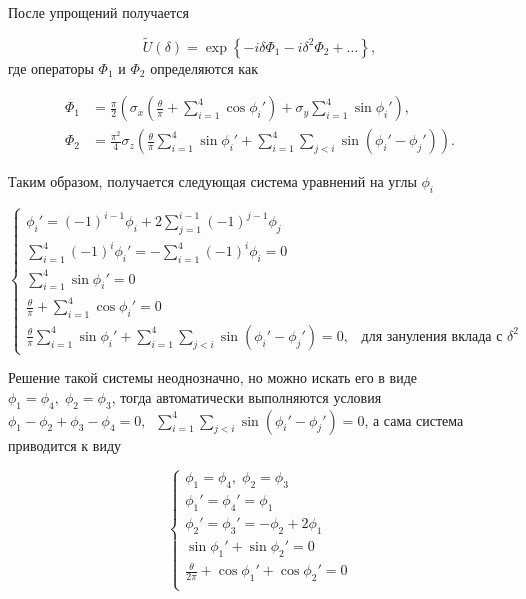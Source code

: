 После упрощений получается

\begin{equation}
	\tilde{U}(\delta) = \exp{\left\{ -i\delta \Phi_1 - i\delta^2 \Phi_2+\ldots \right\}},
\end{equation}
где операторы $\Phi_1$ и $\Phi_2$ определяются как

\begin{equation}
	\begin{aligned}
		\Phi_1 & = \frac{\pi}{2}\left(\sigma_x \left(\frac{\theta}{\pi} + \sum_{i=1}^{4}\cos \phi_i' \right)+\sigma_y \sum_{i=1}^{4}\sin \phi_i'\right), \\
		\Phi_2 & = \frac{\pi^2}{4}\sigma_z\left(\frac{\theta}{\pi}\sum_{i=1}^{4}\sin \phi_i' + 
	\sum_{i=1}^{4} \sum_{j<i} \sin\left(\phi_i' - \phi_j'\right) \right).
	\end{aligned}
\end{equation}

Таким образом, получается следующая система уравнений на углы $\phi_i$

\begin{equation}
	\begin{cases}
		\phi_i' = (-1)^{i-1} \phi_i + 2 \sum_{j=1}^{i-1}(-1)^{j-1}\phi_j \\
		\sum_{i=1}^{4} (-1)^i \phi_i' = -\sum_{i=1}^{4} (-1)^i \phi_i = 0 \\
		\sum_{i=1}^{4} \sin \phi_i' = 0 \\ 
		\frac{\theta}{\pi} + \sum_{i=1}^{4} \cos \phi_i' = 0 \\ 
		\frac{\theta}{\pi}\sum_{i=1}^{4}\sin \phi_i' + 
	\sum_{i=1}^{4} \sum_{j<i} \sin\left(\phi_i' - \phi_j'\right) = 0, \;\;\; \text{для зануления вклада с $\delta^2$}
	\end{cases}
\end{equation}


Решение такой системы неоднозначно, но можно искать его в виде $\phi_1 = \phi_4, \; \phi_2 = \phi_3$, тогда автоматически выполняются условия $\phi_1-\phi_2+\phi_3-\phi_4=0, \;\; \sum_{i=1}^{4}\sum_{j<i}\sin\left(\phi_i'-\phi_j'\right)=0$, а сама система приводится к виду

\begin{equation}
	\begin{cases}
		\phi_1 = \phi_4, \; \phi_2 = \phi_3 \\
		\phi_1' = \phi_4' = \phi_1\\
		\phi_2' = \phi_3' = -\phi_2 + 2\phi_1\\
		\sin \phi_1' + \sin \phi_2' = 0 \\ 
		\frac{\theta}{2\pi} + \cos \phi_1' + \cos \phi_2' = 0 \\ 
	\end{cases}
\end{equation}

